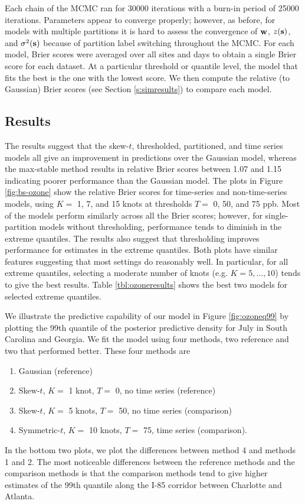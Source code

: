 \documentclass[11pt]{article}
\begin{document}
Each chain of the MCMC ran for 30000 iterations with a burn-in period of 25000 iterations.
Parameters appear to converge properly; however, as before, for models with multiple partitions it is hard to assess the convergence of $\mbox{\bf w}$, $z(\mbox{\bf s})$, and $\sigma^2(\mbox{\bf s})$ because of partition label switching throughout the MCMC.
For each model, Brier scores were averaged over all sites and days to obtain a single Brier score for each dataset.
At a particular threshold or quantile level, the model that fits the best is the one with the lowest score.
We then compute the relative (to Gaussian) Brier scores (see Section \ref{s:simresults}) to compare each model.

\subsection{Results}\label{s:results}
The results suggest that the skew-$t$, thresholded, partitioned, and time series models all give an improvement in predictions over the Gaussian model, whereas the max-stable method results in relative Brier scores between 1.07 and 1.15 indicating poorer performance than the Gaussian model.
The plots in Figure \ref{fig:bs-ozone} show the relative Brier scores for time-series and non-time-series models, using $K = $ 1, 7, and 15 knots at thresholds $T = $ 0, 50, and 75 ppb.
Most of the models perform similarly across all the Brier scores; however, for single-partition models without thresholding, performance tends to diminish in the extreme quantiles.
The results also suggest that thresholding improves performance for estimates in the extreme quantiles.
Both plots have similar features suggesting that most settings do reasonably well.
In particular, for all extreme quantiles, selecting a moderate number of knots (e.g. $K = 5, \ldots, 10$) tends to give the best results.
Table \ref{tbl:ozoneresults} shows the best two models for selected extreme quantiles.

We illustrate the predictive capability of our model in Figure \ref{fig:ozoneq99} by plotting the 99th quantile of the posterior predictive density for July in South Carolina and Georgia.
We fit the model using four methods, two reference and two that performed better.
These four methods are
\begin{enumerate}\setlength{\itemsep}{-0.5em}
  \item Gaussian (reference)
  \item Skew-$t$, $K =$ 1 knot, $T = $ 0, no time series (reference)
  \item Skew-$t$, $K =$ 5 knots, $T = $ 50, no time series (comparison)
  \item Symmetric-$t$, $K =$ 10 knots, $T = $ 75, time series (comparison).
\end{enumerate}
In the bottom two plots, we plot the differences between method 4 and methods 1 and 2.
The most noticeable differences between the reference methods and the comparison methods is that the comparison methods tend to give higher estimates of the 99th quantile along the I-85 corridor between Charlotte and Atlanta.
\end{document}
